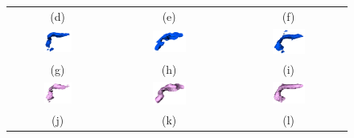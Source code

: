 \begin{figure}[h!]
\begin{center}
{\begin{tabular}{ccc}
				(d) & (e) & (f) \\
				\includegraphics[width=0.3\textwidth]{Bulgular-Irdeleme/Figures/68mrcnn3D.png} & \includegraphics[width=0.3\textwidth]{Bulgular-Irdeleme/Figures/70mrcnn3D.png} & \includegraphics[width=0.3\textwidth]{Bulgular-Irdeleme/Figures/74mrcnn3D.png} \\
				(g) & (h) & (i) \\
				\includegraphics[width=0.3\textwidth]{Bulgular-Irdeleme/Figures/68unet3D.png} & \includegraphics[width=0.3\textwidth]{Bulgular-Irdeleme/Figures/70unet3D.png} & \includegraphics[width=0.3\textwidth]{Bulgular-Irdeleme/Figures/74unet3D.png} \\
				(j) & (k) & (l)
			\end{tabular}
		}
	\end{center}
\end{figure}

